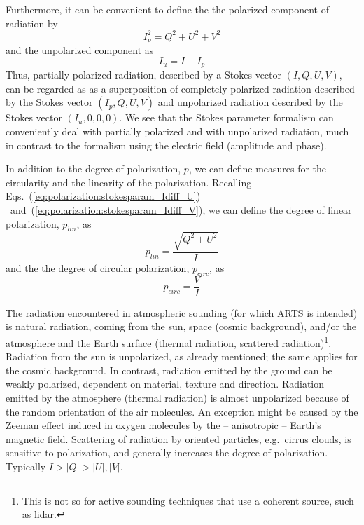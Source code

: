 Furthermore, it can be convenient to define the the polarized
component of radiation by
\begin{equation}
  \label{eq:polarization:pol_component}
  I_p^2 = Q^2 + U^2 + V^2
\end{equation}
and the unpolarized component as
\begin{equation}
  \label{eq:polarization:unpol_component}
  I_u = I - I_p
\end{equation}
Thus, partially polarized radiation, described by a Stokes vector $(I,
Q, U, V)$, can be regarded as as a superposition of completely
polarized radiation described by the Stokes vector $(I_p, Q, U, V)$
and unpolarized radiation described by the Stokes vector $(I_u,
0,0,0)$.  We see that the Stokes parameter formalism can conveniently
deal with partially polarized and with unpolarized radiation, much in
contrast to the formalism using the electric field (amplitude and
phase).

In addition to the degree of polarization, $p$, we can define measures
for the circularity and the linearity of the polarization.
Recalling Eqs.~(\ref{eq:polarization:stokesparam_Idiff_U})%
~and~(\ref{eq:polarization:stokesparam_Idiff_V}),
we can define the degree of linear polarization, $p_{lin}$, as
\begin{equation}
  \label{eq:polarization:p_lin}
 p_{lin} = \frac{\sqrt{Q^2 + U^2}}{I} 
\end{equation}
and the the degree of circular polarization, $p_{circ}$, as
\begin{equation}
  \label{eq:polarization:p_circ}
 p_{circ} = \frac{V}{I} 
\end{equation}


\label{sec:polarization:atmosphere}
The radiation encountered in atmospheric sounding (for which ARTS is
intended) is natural radiation, coming from the sun, space (cosmic
background), and/or the atmosphere and the Earth surface (thermal
radiation, scattered radiation)\footnote{This is not so for active
  sounding techniques that use a coherent source, such as lidar.}.
Radiation from the sun is unpolarized, as already mentioned; the same
applies for the cosmic background.  In contrast,
radiation emitted by the ground can be weakly polarized, dependent on
material, texture and direction.  Radiation emitted by the atmosphere
(thermal radiation) is almost unpolarized because of the random
orientation of the air molecules.  An exception might be caused by the
Zeeman effect induced in oxygen molecules by the -- anisotropic --
Earth's magnetic field.  Scattering of radiation by oriented
particles, e.g.\ cirrus clouds, is sensitive to polarization, and
generally increases the degree of polarization.  Typically $I > |Q| >
|U|,|V|$.

